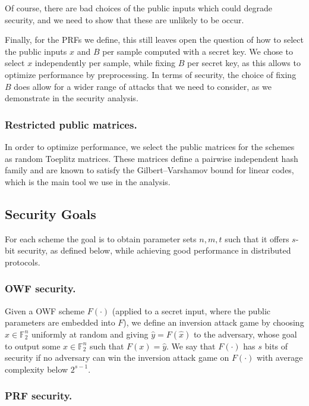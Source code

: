 \documentclass[orivec,envcountsect]{llncs}
\begin{document}
Of course, there are bad choices of the public inputs which could degrade security,
and we need to show that these are unlikely to be occur.

Finally, for the PRFs we define, this still leaves open the question of how to select the public inputs $x$ and $B$
per sample computed with a secret key. We chose to select $x$ independently per sample,
while fixing $B$ per secret key, as this allows to optimize performance by preprocessing.
In terms of security, the choice of fixing $B$ does allow for a wider range of attacks
that we need to consider, as we demonstrate in the security analysis.

\subsubsection{Restricted public matrices.}
In order to optimize performance, we select the public matrices 
for the schemes as random Toeplitz matrices. These matrices 
define a pairwise independent hash family and are known to satisfy the 
Gilbert–Varshamov bound for linear codes, which is the main tool we use in the analysis.


\subsection{Security Goals}
For each scheme the goal is to obtain parameter sets $n,m,t$ such that it offers
$s$-bit security, as defined below, while achieving good performance in distributed protocols.

\subsubsection{OWF security.}

Given a OWF scheme $F(\cdot)$ (applied to a secret input, where the public parameters are embedded into $F$), 
we define an inversion attack game by choosing $\hat{x} \in \mathbb{F}_2^n$
uniformly at random and giving $\hat{y}= F(\hat{x})$ to the adversary, whose
goal to output some $x \in \mathbb{F}_2^n$ such that $F(x) = \hat{y}$.
We say that $F(\cdot)$ has $s$ bits of security if no adversary can win the inversion attack game on $F(\cdot)$ with average complexity below $2^{s-1}$.


\subsubsection{PRF security.}
\end{document}
